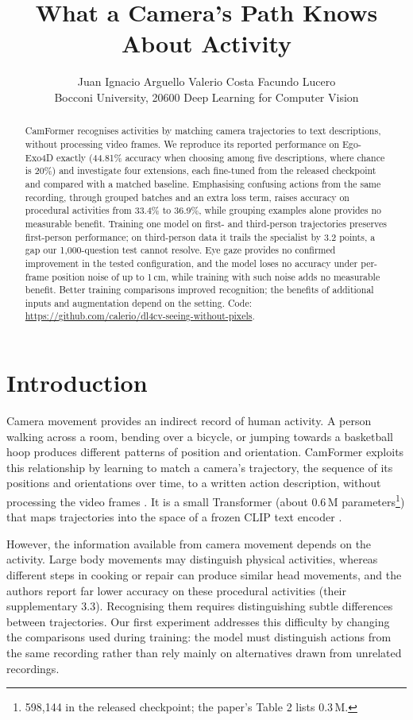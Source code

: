 \documentclass[10pt,twocolumn,letterpaper]{article}
\title{What a Camera's Path Knows About Activity}
\author{Juan Ignacio Arguello \qquad Valerio Costa \qquad Facundo Lucero\\
Bocconi University, 20600 Deep Learning for Computer Vision}
\begin{document}
\maketitle

\begin{abstract}
CamFormer \cite{xue2026seeing} recognises activities by matching camera trajectories to text descriptions, without
processing video frames. We reproduce its reported performance on Ego-Exo4D exactly (44.81\% accuracy when choosing
among five descriptions, where chance is 20\%) and investigate four extensions, each fine-tuned from the released
checkpoint and compared with a matched baseline. Emphasising confusing actions from the same recording, through
grouped batches and an extra loss term, raises accuracy on procedural activities from 33.4\% to 36.9\%, while
grouping examples alone provides no measurable benefit. Training one model on first- and third-person trajectories
preserves first-person performance; on third-person data it trails the specialist by 3.2 points, a gap our
1,000-question test cannot resolve. Eye gaze provides no confirmed improvement in the tested configuration, and the
model loses no accuracy under per-frame position noise of up to 1\,cm, while training with such noise adds no
measurable benefit. Better training comparisons improved recognition; the benefits of additional inputs and
augmentation depend on the setting.
Code: \url{https://github.com/calerio/dl4cv-seeing-without-pixels}.
\end{abstract}

\section{Introduction}
Camera movement provides an indirect record of human activity. A person walking across a room, bending over a
bicycle, or jumping towards a basketball hoop produces different patterns of position and orientation. CamFormer
exploits this relationship by learning to match a camera's trajectory, the sequence of its positions and
orientations over time, to a written action description, without processing the video frames
\cite{xue2026seeing}. It is a small Transformer (about 0.6\,M parameters\footnote{598,144 in the released
checkpoint; the paper's Table 2 lists 0.3\,M.}) that maps trajectories into the space of a frozen CLIP text
encoder \cite{radford2021clip}.

However, the information available from camera movement depends on the activity. Large body movements may
distinguish physical activities, whereas different steps in cooking or repair can produce similar head movements,
and the authors report far lower accuracy on these procedural activities (their supplementary 3.3). Recognising
them requires distinguishing subtle differences between trajectories. Our first experiment addresses this
difficulty by changing the comparisons used during training: the model must distinguish actions from the same
recording rather than rely mainly on alternatives drawn from unrelated recordings.
\end{document}
